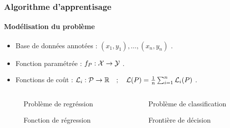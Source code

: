 \begin{frame}
\frametitle{Algorithme d'apprentisage}
\framesubtitle{Modélisation du problème}
\begin{itemize}
    \item<1->   Base de données annotées : ${(x_1,y_1), \ldots,(x_n,y_n)}$ .
    \item<2->   Fonction paramétrée : $f_P:{\mathcal X} \to {\mathcal Y}$ .
    \item<2->   Fonctions de coût : $ {\mathcal L}_i:{\mathcal P}\to{\mathbb R} \quad ; \quad  {\mathcal L}(P)=\frac{1}{n}\sum_{i=1}^n {\mathcal L}_i(P)$ .
\end{itemize}

\begin{columns}
    \begin{column}{6cm}
        \begin{figure}
        \begin{overprint}
            \centering\caption{Problème de regréssion}
            \centering\caption{Fonction de régression}
        \end{overprint}
    \end{figure}
    \end{column}
    \begin{column}{6cm}
        \begin{figure}
        \begin{overprint}
            \centering\caption{Problème de classification}
            \centering\caption{Frontière de décision}
        \end{overprint}
        \end{figure}
    \end{column}
\end{columns}
\end{frame}

